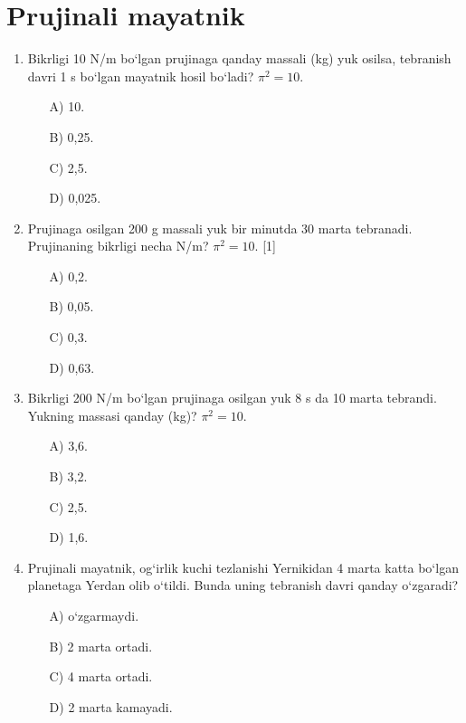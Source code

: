 \section{Prujinali mayatnik}

\begin{enumerate}
    \item Bikrligi 10 N/m bo‘lgan prujinaga qanday massali (kg) yuk osilsa, tebranish davri 1 s bo‘lgan mayatnik hosil bo‘ladi? $\pi^2=10$.
    \begin{itemize}
        \item[A)] 10.
        \item[B)] 0,25.
        \item[C)] 2,5.
        \item[D)] 0,025.
        
    \end{itemize}

    \item Prujinaga osilgan 200 g massali yuk bir minutda 30 marta tebranadi. Prujinaning bikrligi necha N/m? $\pi^2=10$. [1]
    \begin{itemize}
        \item[A)] 0,2.
        \item[B)] 0,05.
        \item[C)] 0,3.
        \item[D)] 0,63.
        
    \end{itemize}

    \item Bikrligi 200 N/m bo‘lgan prujinaga osilgan yuk 8 s da 10 marta tebrandi. Yukning massasi qanday (kg)? $\pi^2=10$.
    \begin{itemize}
        \item[A)] 3,6.
        \item[B)] 3,2.
        \item[C)] 2,5.
        \item[D)] 1,6.
        
    \end{itemize}

    \item Prujinali mayatnik, og‘irlik kuchi tezlanishi Yernikidan 4 marta katta bo‘lgan planetaga Yerdan olib o‘tildi. Bunda uning tebranish davri qanday o‘zgaradi?
    \begin{itemize}
        \item[A)] o‘zgarmaydi.
        \item[B)] 2 marta ortadi.
        \item[C)] 4 marta ortadi.
        \item[D)] 2 marta kamayadi.
        

\end{itemize}
\end{enumerate}

